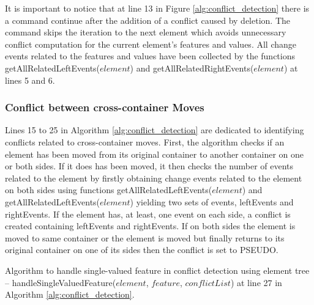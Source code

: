 It is important to notice that at line 13 in Figure \ref{alg:conflict_detection} there is a command \textsf{continue} after the addition of a conflict caused by deletion. The command skips the iteration to the next element which avoids unnecessary conflict computation for the current element's  features and values. All change events related to the features and values have been collected by the functions \textsf{getAllRelatedLeftEvents($element$)} and \textsf{getAllRelatedRightEvents($element$)} at lines 5 and 6.  

\subsubsection{Conflict between cross-container Moves} 
\label{sec:move_conflict} 
Lines 15 to 25 in Algorithm \ref{alg:conflict_detection} are dedicated to identifying conflicts related to cross-container moves. 
First, the algorithm checks if an element has been moved from its original container to another container on one or both sides. 
If it does has been moved, 
it then checks the number of events related to the element by firstly obtaining change events related to the element on 
both sides using functions \textsf{getAllRelatedLeftEvents($element$)} and \textsf{getAllRelatedLeftEvents($element$)} yielding two sets of events, 
\textsf{leftEvents} and \textsf{rightEvents}. If the element has, at least, one event on each side,
a conflict is created containing \textsf{leftEvents} and \textsf{rightEvents}. 
If on both sides the element is moved to same container or the element is moved but finally returns to its original container on one of its sides then the conflict is set to \textsf{PSEUDO}.

\IncMargin{1.5em}
\begin{algorithm*}[]
  \caption{Algorithm to handle single-valued feature in conflict detection using element tree -- handleSingleValuedFeature($element$, $feature$, $conflictList$) at line 27 in Algorithm \ref{alg:conflict_detection}.}
  \label{alg:conflict_single_valued_feature}
\end{algorithm*}
\DecMargin{1.5em}

